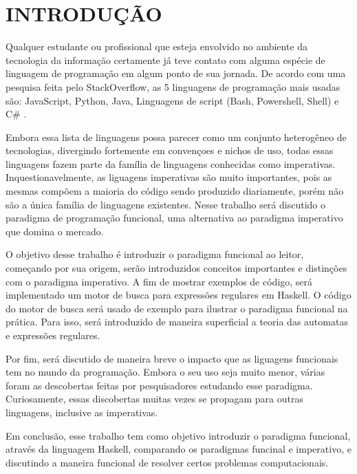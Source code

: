 \section{INTRODUÇÃO}
Qualquer estudante ou profissional que esteja envolvido no ambiente da tecnologia da informação certamente já teve contato com alguma espécie de linguagem de programação em algum ponto de sua jornada.
De acordo com uma pesquisa feita pelo StackOverflow, as 5 linguagens de programação mais usadas são: JavaScript, Python, Java, Linguagens de script (Bash, Powershell, Shell) e C\# \cite{stack-overflow}.

Embora essa lista de linguagens possa parecer como um conjunto heterogêneo de tecnologias, divergindo fortemente em convençoes e nichos de uso, todas essas linguagens fazem parte da família de linguagens conhecidas como imperativas.
Inquestionavelmente, as liguagens imperativas são muito importantes, pois as mesmas compõem a maioria do código sendo produzido diariamente, porém não são a única família de linguagens existentes.
Nesse trabalho será discutido o paradigma de programação funcional, uma alternativa ao paradigma imperativo que domina o mercado.

O objetivo desse trabalho é introduzir o paradigma funcional ao leitor, começando por sua origem, serão introduzidos conceitos importantes e distinções com o paradigma imperativo.
A fim de mostrar exemplos de código, será implementado um motor de busca para expressões regulares em Haskell.
O código do motor de busca será usado de exemplo para ilustrar o paradigma funcional na prática.
Para isso, será introduzido de maneira superficial a teoria das automatas e expressões regulares.

Por fim, será discutido de maneira breve o impacto que as liguagens funcionais tem no mundo da programação.
Embora o seu uso seja muito menor, várias foram as descobertas feitas por pesquisadores estudando esse paradigma.
Curiosamente, essas discobertas muitas vezes se propagam para outras linguagens, inclusive as imperativas.

Em conclusão, esse trabalho tem como objetivo introduzir o paradigma funcional, através da linguagem Haskell, comparando os paradigmas funcinal e imperativo, e discutindo a maneira funcional de resolver certos problemas computacionais.
